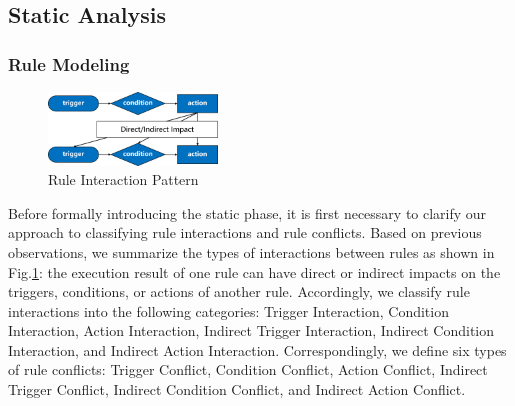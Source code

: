 \subsection{Static Analysis}

\subsubsection{Rule Modeling}

\begin{figure}[htbp]
	\centering
	\includegraphics[width=0.4\textwidth]{figure/classification_observation.png}
	\caption{Rule Interaction Pattern}
	\label{classification_observation}
\end{figure}

Before formally introducing the static phase, it is first necessary to clarify our approach to classifying rule interactions and rule conflicts. Based on previous observations, we summarize the types of interactions between rules as shown in Fig.\ref{classification_observation}: the execution result of one rule can have direct or indirect impacts on the triggers, conditions, or actions of another rule. Accordingly, we classify rule interactions into the following categories: Trigger Interaction, Condition Interaction, Action Interaction, Indirect Trigger Interaction, Indirect Condition Interaction, and Indirect Action Interaction. Correspondingly, we define six types of rule conflicts: Trigger Conflict, Condition Conflict, Action Conflict, Indirect Trigger Conflict, Indirect Condition Conflict, and Indirect Action Conflict.

